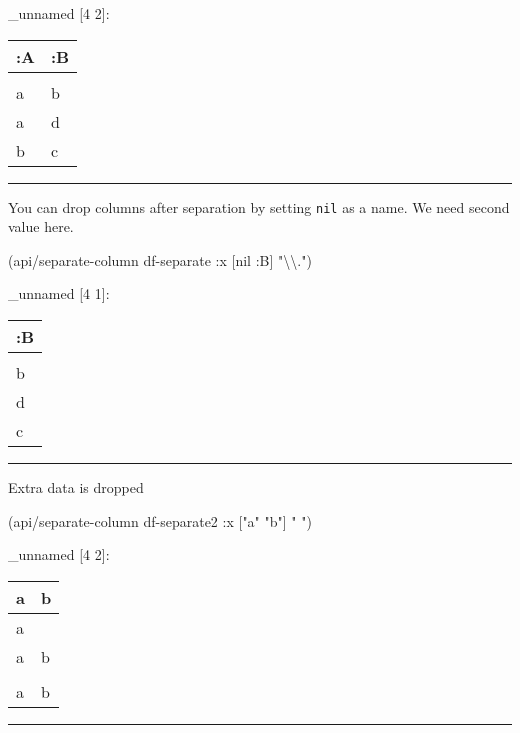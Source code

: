 \documentclass[]{article}
\newenvironment{Shaded}{\begin{snugshade}}{\end{snugshade}}
\newcommand{\AttributeTok}[1]{\textcolor[rgb]{0.77,0.63,0.00}{#1}}
\newcommand{\NormalTok}[1]{#1}
\newcommand{\SpecialCharTok}[1]{\textcolor[rgb]{0.00,0.00,0.00}{#1}}
\newcommand{\StringTok}[1]{\textcolor[rgb]{0.31,0.60,0.02}{#1}}
\newcommand{\VariableTok}[1]{\textcolor[rgb]{0.00,0.00,0.00}{#1}}
\begin{document}
\_unnamed {[}4 2{]}:

\begin{longtable}[]{@{}ll@{}}
\toprule
:A & :B\tabularnewline
\midrule
\endhead
&\tabularnewline
a & b\tabularnewline
a & d\tabularnewline
b & c\tabularnewline
\bottomrule
\end{longtable}

\begin{center}\rule{0.5\linewidth}{0.5pt}\end{center}

You can drop columns after separation by setting \texttt{nil} as a name.
We need second value here.

\begin{Shaded}
\begin{Highlighting}[]
\NormalTok{(api/separate-column df-separate }\AttributeTok{:x}\NormalTok{ [}\VariableTok{nil} \AttributeTok{:B}\NormalTok{] }\StringTok{"}\SpecialCharTok{\textbackslash{}\textbackslash{}}\StringTok{."}\NormalTok{)}
\end{Highlighting}
\end{Shaded}

\_unnamed {[}4 1{]}:

\begin{longtable}[]{@{}l@{}}
\toprule
:B\tabularnewline
\midrule
\endhead
\tabularnewline
b\tabularnewline
d\tabularnewline
c\tabularnewline
\bottomrule
\end{longtable}

\begin{center}\rule{0.5\linewidth}{0.5pt}\end{center}

Extra data is dropped

\begin{Shaded}
\begin{Highlighting}[]
\NormalTok{(api/separate-column df-separate2 }\AttributeTok{:x}\NormalTok{ [}\StringTok{"a"} \StringTok{"b"}\NormalTok{] }\StringTok{" "}\NormalTok{)}
\end{Highlighting}
\end{Shaded}

\_unnamed {[}4 2{]}:

\begin{longtable}[]{@{}ll@{}}
\toprule
a & b\tabularnewline
\midrule
\endhead
a &\tabularnewline
a & b\tabularnewline
&\tabularnewline
a & b\tabularnewline
\bottomrule
\end{longtable}

\begin{center}\rule{0.5\linewidth}{0.5pt}\end{center}
\end{document}

